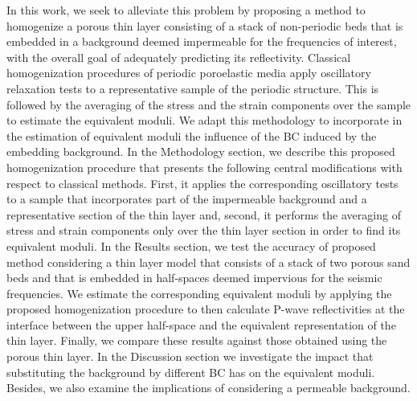 \documentclass[draft]{agujournal2019}
\begin{document}
In this work, we seek to alleviate this problem by proposing a method to homogenize a porous thin layer consisting of a stack of non-periodic beds that is embedded in a background deemed impermeable for the frequencies of interest, with the overall goal of adequately predicting its reflectivity. Classical homogenization procedures of periodic poroelastic media apply oscillatory relaxation tests to a representative sample of the periodic structure. This is followed by the averaging of the stress and the strain components over the sample to estimate the equivalent moduli. We adapt this methodology to incorporate in the estimation of equivalent moduli the influence of the BC induced by the embedding background.
In the Methodology section, we describe this proposed homogenization procedure that presents the following central modifications with respect to classical methods. First, it applies the corresponding oscillatory tests to a sample that incorporates part of the impermeable background and a representative section of the 
thin layer and, second, it performs the averaging of stress and strain components only over the thin layer section in order to find its equivalent moduli. In the Results section, we
test the accuracy of proposed method considering a thin layer model that consists of a stack of two  porous sand beds and that is embedded in half-spaces deemed impervious for the seismic frequencies. We estimate the corresponding equivalent moduli by applying the proposed homogenization procedure to then calculate P-wave reflectivities at the interface between the upper half-space and the equivalent representation of the thin layer. Finally, we compare these results against those obtained using the porous thin layer. In the Discussion section we investigate the impact that substituting the background by different BC has on the equivalent moduli. Besides, we also examine the implications of considering a permeable background.
 
\end{document}

